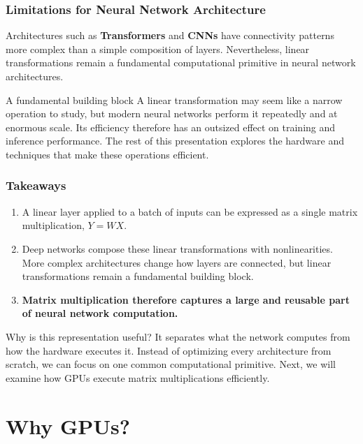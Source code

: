 \documentclass{beamer}
\begin{document}
\begin{frame}
  \frametitle{Limitations for Neural Network Architecture}

  

  Architectures such as \textbf{Transformers} and \textbf{CNNs} have connectivity
  patterns more complex than a simple composition of layers. Nevertheless, linear
  transformations remain a fundamental computational primitive in neural network
  architectures.

  \begin{block}{A fundamental building block}
    A linear transformation may seem like a narrow operation to study, but modern
    neural networks perform it repeatedly and at enormous scale. Its efficiency
    therefore has an outsized effect on training and inference performance. The
    rest of this presentation explores the hardware and techniques that make these
    operations efficient.
  \end{block}

\end{frame}

\begin{frame}
  \frametitle{Takeaways}
  \begin{enumerate}
    \item A linear layer applied to a batch of inputs can be expressed as a single
      matrix multiplication, \(Y = WX\).
    \item Deep networks compose these linear transformations with nonlinearities.
      More complex architectures change how layers are connected, but linear
      transformations remain a fundamental building block.
    \item \textbf{Matrix multiplication therefore captures a large and reusable part of
      neural network computation.}
  \end{enumerate}

  \begin{alertblock}{Why is this representation useful?}
    It separates what the network computes from how the hardware executes it.
    Instead of optimizing every architecture from scratch, we can focus on one
    common computational primitive. Next, we will examine how GPUs execute matrix
    multiplications efficiently.
  \end{alertblock}
\end{frame}

\section{Why GPUs?}
\end{document}
